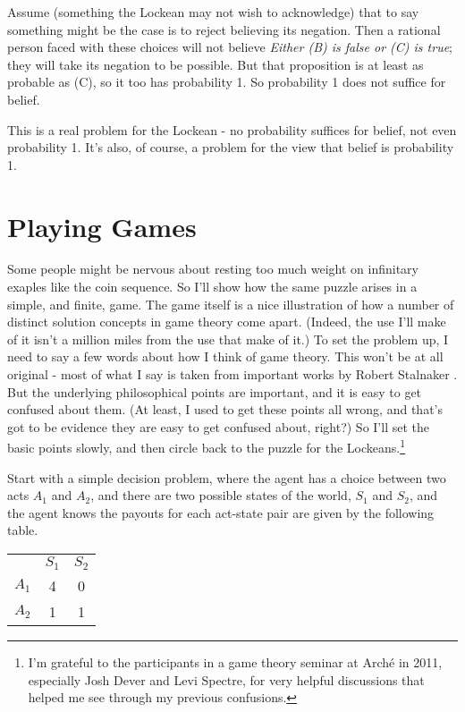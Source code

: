 \documentclass[11pt,]{book}
\let\rmarkdownfootnote\footnote%
\def\footnote{\protect\rmarkdownfootnote}
\def\toprule{}
\def\bottomrule{}
\begin{document}
Assume (something the Lockean may not wish to acknowledge) that to say something might be the case is to reject believing its negation. Then a rational person faced with these choices will not believe \emph{Either (B) is false or (C) is true}; they will take its negation to be possible. But that proposition is at least as probable as (C), so it too has probability 1. So probability 1 does not suffice for belief.

This is a real problem for the Lockean - no probability suffices for belief, not even probability 1. It's also, of course, a problem for the view that belief is probability 1.

\hypertarget{lockegames}{%
\section{Playing Games}\label{lockegames}}

Some people might be nervous about resting too much weight on infinitary exaples like the coin sequence. So I'll show how the same puzzle arises in a simple, and finite, game. The game itself is a nice illustration of how a number of distinct solution concepts in game theory come apart. (Indeed, the use I'll make of it isn't a million miles from the use that \citet{KohlbergMertens1986} make of it.) To set the problem up, I need to say a few words about how I think of game theory. This won't be at all original - most of what I say is taken from important works by Robert Stalnaker \citetext{\citeyear{Stalnaker1994}; \citeyear{Stalnaker1996}; \citeyear{Stalnaker1998}; \citeyear{Stalnaker1999}}. But the underlying philosophical points are important, and it is easy to get confused about them. (At least, I used to get these points all wrong, and that's got to be evidence they are easy to get confused about, right?) So I'll set the basic points slowly, and then circle back to the puzzle for the Lockeans.\footnote{I'm grateful to the participants in a game theory seminar at Arché in 2011, especially Josh Dever and Levi Spectre, for very helpful discussions that helped me see through my previous confusions.}

Start with a simple decision problem, where the agent has a choice between two acts \(A_1\) and \(A_2\), and there are two possible states of the world, \(S_1\) and \(S_2\), and the agent knows the payouts for each act-state pair are given by the following table.

\begin{longtable}[]{@{}lcc@{}}
\toprule
\endhead
& \(S_1\) & \(S_2\)\tabularnewline
\(A_1\) & 4 & 0\tabularnewline
\(A_2\) & 1 & 1\tabularnewline
\bottomrule
\end{longtable}
\end{document}
